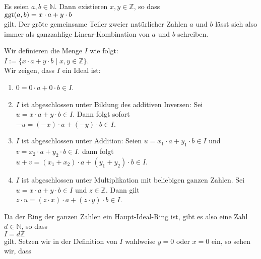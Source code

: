 \begin{Satz}
\label{satz:bezout}
  Es seien $a,b \in \mathbb{N}$.  Dann existieren $x,y \in \mathbb{Z}$, so dass
  \\[0.2cm]
  \hspace*{1.3cm}
  $\textsl{ggt}(a,b) = x \cdot a + y \cdot b$
  \\[0.2cm]
  gilt.  Der gr\"{o}\3te gemeinsame Teiler zweier nat\"{u}rlicher Zahlen $a$ und $b$ 
  l\"{a}sst sich also immer als ganzzahlige Linear-Kombination von $a$ und $b$ schreiben.
\end{Satz}

\proof
Wir definieren die Menge $I$ wie folgt:
\\[0.2cm]
\hspace*{1.3cm}
$I := \bigl\{ x \cdot a + y \cdot b \mid x,y \in \mathbb{Z} \bigr\}$.
\\[0.2cm]
Wir zeigen, dass $I$ ein Ideal ist:
\begin{enumerate}
\item $0 = 0 \cdot a + 0 \cdot b \in I$.
\item $I$ ist abgeschlossen unter Bildung des additiven Inversen:  Sei
      $u = x \cdot a + y \cdot b \in I$.  Dann folgt sofort
      \\[0.2cm]
      \hspace*{1.3cm}
      $-u = (-x) \cdot a + (-y) \cdot b \in I$.
\item $I$ ist abgeschlossen unter Addition: Seien  
      $u = x_1 \cdot a + y_1 \cdot b \in I$ und $v = x_2 \cdot a + y_2 \cdot b \in I$.
      dann folgt
      \\[0.2cm]
      \hspace*{1.3cm}
      $u + v = (x_1 + x_2) \cdot a + (y_1 + y_2) \cdot b \in I$.
\item $I$ ist abgeschlossen unter Multiplikation mit beliebigen ganzen Zahlen.  
      Sei $u = x \cdot a + y \cdot b \in I$ und $z \in \mathbb{Z}$.  Dann gilt
      \\[0.2cm]
      \hspace*{1.3cm}
      $z \cdot u = (z \cdot x) \cdot a + (z \cdot y) \cdot b \in I$.
\end{enumerate}
Da der Ring der ganzen Zahlen ein Haupt-Ideal-Ring ist, gibt es also eine Zahl $d \in \mathbb{N}$, 
so dass
\\[0.2cm]
\hspace*{1.3cm}
$I = d\mathbb{Z}$
\\[0.2cm]
gilt.  Setzen wir in der Definition von $I$ wahlweise $y = 0$ oder $x = 0$ ein, so sehen wir, dass
